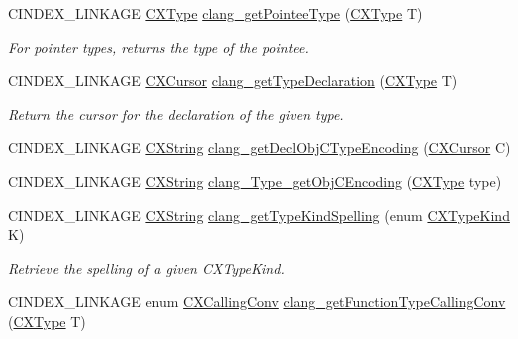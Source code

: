 \begin{DoxyCompactItemize}
C\+I\+N\+D\+E\+X\+\_\+\+L\+I\+N\+K\+A\+GE \hyperlink{structCXType}{C\+X\+Type} \hyperlink{group__CINDEX__TYPES_gaafa3eb34932d8da1358d50ed949ff3ee}{clang\+\_\+get\+Pointee\+Type} (\hyperlink{structCXType}{C\+X\+Type} T)
\begin{DoxyCompactList}\small\item\em For pointer types, returns the type of the pointee. \end{DoxyCompactList}\item 
\mbox{\label{group__CINDEX__TYPES_ga0aad74ea93a2f5dea58fd6fc0db8aad4}} 
C\+I\+N\+D\+E\+X\+\_\+\+L\+I\+N\+K\+A\+GE \hyperlink{structCXCursor}{C\+X\+Cursor} \hyperlink{group__CINDEX__TYPES_ga0aad74ea93a2f5dea58fd6fc0db8aad4}{clang\+\_\+get\+Type\+Declaration} (\hyperlink{structCXType}{C\+X\+Type} T)
\begin{DoxyCompactList}\small\item\em Return the cursor for the declaration of the given type. \end{DoxyCompactList}\item 
C\+I\+N\+D\+E\+X\+\_\+\+L\+I\+N\+K\+A\+GE \hyperlink{structCXString}{C\+X\+String} \hyperlink{group__CINDEX__TYPES_ga3ab59f0bd04192dbf250f966b1e9fc8f}{clang\+\_\+get\+Decl\+Obj\+C\+Type\+Encoding} (\hyperlink{structCXCursor}{C\+X\+Cursor} C)
\item 
C\+I\+N\+D\+E\+X\+\_\+\+L\+I\+N\+K\+A\+GE \hyperlink{structCXString}{C\+X\+String} \hyperlink{group__CINDEX__TYPES_ga03b6fac5491434832d1a49ba1ebc80be}{clang\+\_\+\+Type\+\_\+get\+Obj\+C\+Encoding} (\hyperlink{structCXType}{C\+X\+Type} type)
\item 
\mbox{\label{group__CINDEX__TYPES_ga6bd7b366d998fc67f4178236398d0666}} 
C\+I\+N\+D\+E\+X\+\_\+\+L\+I\+N\+K\+A\+GE \hyperlink{structCXString}{C\+X\+String} \hyperlink{group__CINDEX__TYPES_ga6bd7b366d998fc67f4178236398d0666}{clang\+\_\+get\+Type\+Kind\+Spelling} (enum \hyperlink{group__CINDEX__TYPES_gaad39de597b13a18882c21860f92b095a}{C\+X\+Type\+Kind} K)
\begin{DoxyCompactList}\small\item\em Retrieve the spelling of a given C\+X\+Type\+Kind. \end{DoxyCompactList}\item 
C\+I\+N\+D\+E\+X\+\_\+\+L\+I\+N\+K\+A\+GE enum \hyperlink{group__CINDEX__TYPES_ga4a0e941ec7b4b64bf9eb3d0ed49d55ae}{C\+X\+Calling\+Conv} \hyperlink{group__CINDEX__TYPES_gae3392567fa1e69d3921785723f06ce55}{clang\+\_\+get\+Function\+Type\+Calling\+Conv} (\hyperlink{structCXType}{C\+X\+Type} T)

\end{DoxyCompactItemize}
